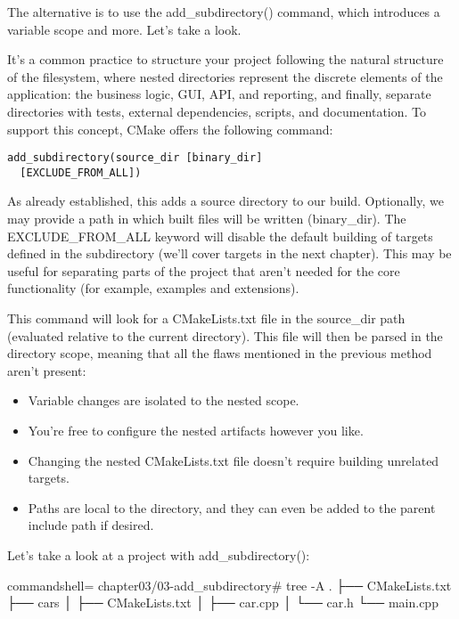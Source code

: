 The alternative is to use the add\_subdirectory() command, which introduces a variable scope and more. Let's take a look.


It's a common practice to structure your project following the natural structure of the filesystem, where nested directories represent the discrete elements of the application: the business logic, GUI, API, and reporting, and finally, separate directories with tests, external dependencies, scripts, and documentation. To support this concept, CMake offers the following command:

\begin{lstlisting}[style=styleCMake]
add_subdirectory(source_dir [binary_dir]
  [EXCLUDE_FROM_ALL])
\end{lstlisting}

As already established, this adds a source directory to our build. Optionally, we may provide a path in which built files will be written (binary\_dir). The EXCLUDE\_FROM\_ALL keyword will disable the default building of targets defined in the subdirectory (we'll cover targets in the next chapter). This may be useful for separating parts of the project that aren't needed for the core functionality (for example, examples and extensions).

This command will look for a CMakeLists.txt file in the source\_dir path (evaluated relative to the current directory). This file will then be parsed in the directory scope, meaning that all the flaws mentioned in the previous method aren't present:

\begin{itemize}
\item 
Variable changes are isolated to the nested scope.

\item 
You're free to configure the nested artifacts however you like.

\item 
Changing the nested CMakeLists.txt file doesn't require building unrelated targets.

\item 
Paths are local to the directory, and they can even be added to the parent include path if desired.
\end{itemize}

Let's take a look at a project with add\_subdirectory():

\begin{tcblisting}{commandshell={}}
chapter03/03-add_subdirectory# tree -A
.
├── CMakeLists.txt
├── cars
│     ├── CMakeLists.txt
│     ├── car.cpp
│     └── car.h
└── main.cpp
\end{tcblisting}

